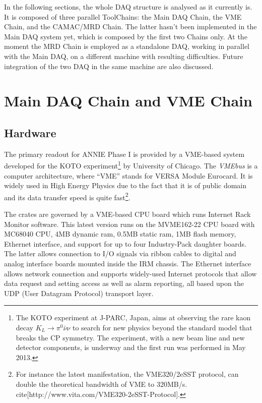In the following sections, the whole DAQ structure is analysed as it currently is.
It is composed of three parallel ToolChains: the Main DAQ Chain, the VME Chain, and %
the CAMAC/MRD Chain.
The latter hasn't been implemented in the Main DAQ system yet, which is composed by the %
first two Chains only.
At the moment the MRD Chain is employed as a standalone DAQ, working in parallel %
with the Main DAQ, on a different machine with resulting difficulties.
Future integration of the two DAQ in the same machine are also discussed.

\section{Main DAQ Chain and VME Chain}


\subsection{Hardware}

The primary readout for ANNIE Phase I is provided by a VME-based system developed for the KOTO %
experiment\footnote{The KOTO experiment at J-PARC, Japan, aims at observing the rare kaon decay %
  $K_L\rightarrow \pi^0 \bar{\nu} \nu$ to search for new physics beyond the standard model that %
  breaks the CP symmetry. The experiment, with a new beam line and new detector components, is %
  underway and the first run was performed in May 2013.} %
by University of Chicago.
The \emph{VMEbus} is a computer architecture, where ``VME'' stands for VERSA Module Eurocard.
It is widely used in High Energy Physics due to the fact that it is of public domain and %
its data transfer speed is quite fast\footnote{For instance the latest manifestation, %
the VME320/2eSST protocol, can double the theoretical bandwidth of VME to 320MB/s.
cite[http://www.vita.com/VME320-2eSST-Protocol].}.

The crates are governed by a VME-based CPU board which runs Internet Rack Monitor software.
This latest version runs on the MVME162-22 CPU board with MC68040 CPU, 4MB dynamic ram, %
0.5MB static ram, 1MB flash memory, Ethernet interface, and support for up to four %
Industry-Pack daughter boards. 
The latter allows connection to I/O signals via ribbon cables to digital and %
analog interface boards mounted inside the IRM chassis. 
The Ethernet interface allows network connection and supports widely-used %
Internet protocols that allow data request and setting access as well as alarm reporting, %
all based upon the UDP (User Datagram Protocol) transport layer.


